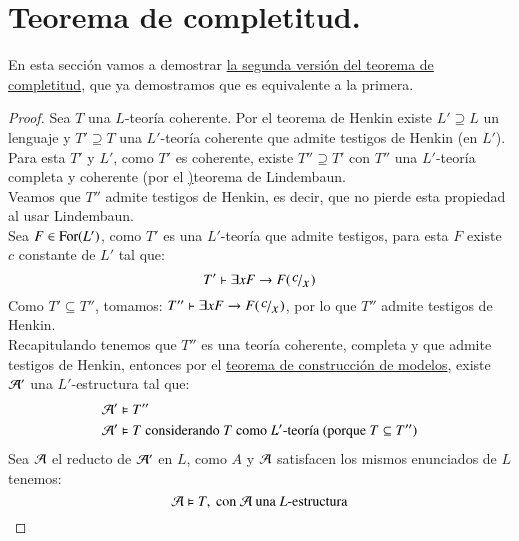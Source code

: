 \section{Teorema de completitud.}

En esta sección vamos a demostrar \hyperref[thm:tc2]{la segunda versión del teorema de completitud}, que ya demostramos que es equivalente a la primera.

\begin{proof}\label{proof:tc2}
    Sea $T$ una $L$-teoría coherente.
    Por el teorema de Henkin existe $L' \supseteq L$ un lenguaje y $T' \supseteq T$ una $L'$-teoría coherente que admite testigos de Henkin (en $L'$). Para esta $T'$ y $L'$, como $T'$ es coherente, existe $T'' \supseteq T'$ con $T''$ una $L'$-teoría completa y coherente (por el \hyperref[thm:lindembaun]){teorema de Lindembaun}.\\
    Veamos que $T''$ admite testigos de Henkin, es decir, que no pierde esta propiedad al usar Lindembaun.\\
    Sea $F \in \mathrm{For}(L')$, como $T'$ es una $L'$-teoría que admite testigos, para esta $F$ existe $c$ constante de $L'$ tal que:
    $$
        T' \vdash \exists x F \then F(\quox c)
    $$
    Como $T' \subseteq T''$, tomamos: $T'' \vdash \exists x F \then F(\quox c)$, por lo que $T''$ admite testigos de Henkin.\\

    Recapitulando tenemos que $T''$ es una teoría coherente, completa y que admite testigos de Henkin, entonces por el \hyperref[thm:modelos]{teorema de construcción de modelos}, existe $\mathcal{A}'$ una $L'$-estructura tal que:
    \begin{align*}
        &\mathcal{A}' \vDash T''\\
        &\mathcal{A}' \vDash T \text{ considerando $T$ como $L'$-teoría (porque $T \subseteq T''$)}
    \end{align*}
    Sea $\mathcal{A}$ el reducto de $\mathcal{A}'$ en $L$, como $A$ y $\mathcal{A}$ satisfacen los mismos enunciados de $L$ tenemos:
    $$
        \mathcal{A} \vDash T,\text{ con } \mathcal{A} \text{ una $L$-estructura}
    $$
\end{proof}
